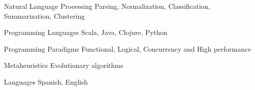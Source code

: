 


\begin{cvskills}


\cvskill
{Natural Language Processing} %
{Parsing, Normalization, Classification, Summarization, Clustering} %




\cvskill
{Programming Languages} %
{Scala, Java, Clojure, Python} %


\cvskill
{Programming Paradigms} %
{Functional, Logical, Concurrency and High performance} %


\cvskill
{Metaheuristics} %
{Evolutionary algorithms} %


\cvskill
{Languages} %
{Spanish, English} %




\end{cvskills}

